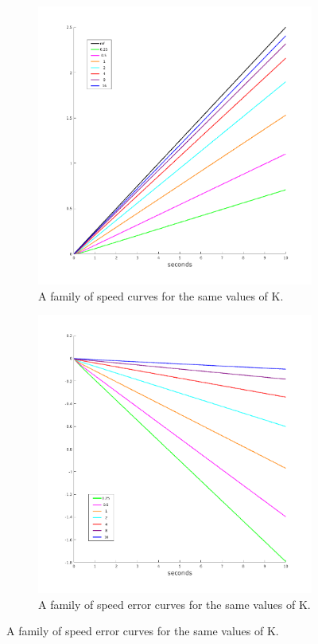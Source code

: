 \documentclass[11pt,a4paper]{article}
\begin{document}
\begin{enumerate}
\begin{figure}[!htbp]
	\centering
	\begin{subfigure}{.5\textwidth}
		\centering
		\includegraphics[width = \textwidth]{imglab/lab4sol_rampspeedkfam.png}
		\caption{A family of speed curves for the same values of K.}
	\end{subfigure}%
	\begin{subfigure}{.5\textwidth}
		\centering
		\includegraphics[width = \textwidth]{imglab/lab4sol_rampspeederr.png}
		\caption{A family of speed error curves for the same values of K.}	
	\end{subfigure}
\end{figure}


\end{enumerate}
\end{document}
